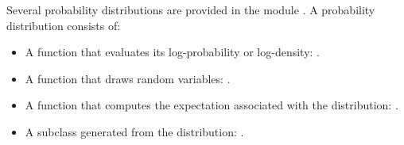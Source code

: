 \documentclass[]{jss_mod}
\begin{document}
\label{sec:distributions}
Several probability distributions are provided in the module . A probability distribution consists of:
\begin{itemize}
    \item A function that evaluates its log-probability or log-density: .
    \item A function that draws random variables: .
    \item A function that computes the expectation associated with the distribution: .
    \item A  subclass generated from the distribution: .
\end{itemize} 
%


\end{document}
